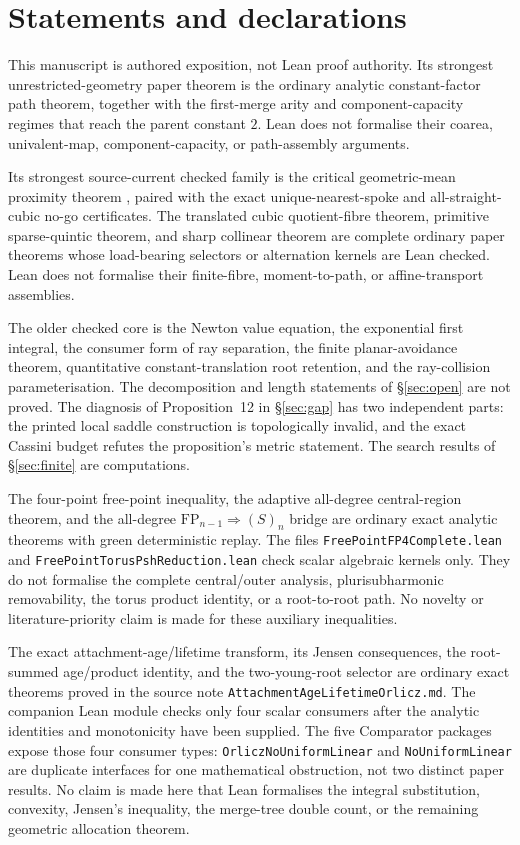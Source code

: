 \documentclass[11pt]{article}
\newcommand{\pdecl}[1]{\emph{\leanlabel{#1}}}
\begin{document}
\section*{Statements and declarations}

This manuscript is authored exposition, not Lean proof authority.  Its
strongest unrestricted-geometry paper theorem is the ordinary analytic
constant-factor path theorem, together with the first-merge arity and
component-capacity regimes that reach the parent constant $2$.  Lean does not
formalise their coarea, univalent-map, component-capacity, or path-assembly
arguments.

Its
strongest source-current checked family is the critical geometric-mean
proximity theorem
\pdecl{exists_two_roots_dist_sum_le_two_mul_geomMean}, paired with the exact
unique-nearest-spoke and all-straight-cubic no-go certificates.  The translated
cubic quotient-fibre theorem, primitive sparse-quintic theorem, and sharp
collinear theorem are complete ordinary paper theorems whose load-bearing
selectors or alternation kernels are Lean checked.  Lean does not formalise
their finite-fibre, moment-to-path, or affine-transport assemblies.

The older checked core is the Newton value equation, the exponential first
integral, the consumer form of ray separation, the finite planar-avoidance
theorem, quantitative constant-translation root retention, and the
ray-collision parameterisation.  The decomposition and length statements of
\S\ref{sec:open} are not proved.  The
diagnosis of Proposition~12 in \S\ref{sec:gap} has two independent parts: the
printed local saddle construction is topologically invalid, and the exact
Cassini budget refutes the proposition's metric statement.  The
search results of \S\ref{sec:finite} are computations.

The four-point free-point inequality, the adaptive all-degree central-region
theorem, and the all-degree $\mathrm{FP}_{n-1}\Rightarrow(S)_n$ bridge are
ordinary exact analytic theorems with green deterministic replay.  The files
\texttt{FreePointFP4Complete.lean} and
\texttt{FreePointTorusPshReduction.lean} check scalar algebraic kernels only.
They do not formalise the complete central/outer analysis, plurisubharmonic
removability, the torus product identity, or a root-to-root path.  No novelty
or literature-priority claim is made for these auxiliary inequalities.

The exact attachment-age/lifetime transform, its Jensen consequences, the
root-summed age/product identity, and the two-young-root selector are ordinary
exact theorems proved in the source note
\texttt{AttachmentAgeLifetimeOrlicz.md}.  The companion Lean module checks
only four scalar consumers after the analytic identities and monotonicity have
been supplied.  The five Comparator packages expose those four consumer
types: \texttt{OrliczNoUniformLinear} and \texttt{NoUniformLinear} are
duplicate interfaces for one mathematical obstruction, not two distinct
paper results.  No claim is made here that Lean formalises the integral
substitution, convexity, Jensen's inequality, the merge-tree double count, or
the remaining geometric allocation theorem.
\end{document}
